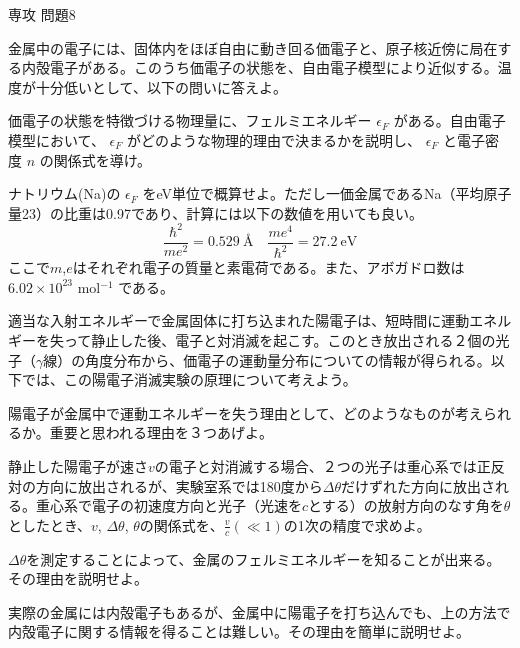 \documentclass[fleqn]{jbook}
\begin{document}
\begin{question}{専攻 問題8}{}

金属中の電子には、固体内をほぼ自由に動き回る価電子と、原子核近傍に局在する内殻電子がある。このうち価電子の状態を、自由電子模型により近似する。温度が十分低いとして、以下の問いに答えよ。

\begin{subquestions}

\SubQuestion

価電子の状態を特徴づける物理量に、フェルミエネルギー $ \epsilon_{F} $ がある。自由電子模型において、 $ \epsilon_{F} $ がどのような物理的理由で決まるかを説明し、 $ \epsilon_{F} $ と電子密度 $ n $ の関係式を導け。

\SubQuestion

 ナトリウム(Na)の $ \epsilon_{F} $ をeV単位で概算せよ。ただし一価金属であるNa（平均原子量23）の比重は0.97であり、計算には以下の数値を用いても良い。
\[
\frac{\hbar^{2}}{m e^{2}} = 0.529\ \textrm{\AA}  \quad \frac{m e^{4}}{\hbar^{2}} = 27.2\ \mathrm{eV}
\]
ここで$m$,$e$はそれぞれ電子の質量と素電荷である。また、アボガドロ数は$ 6.02 \times 10^{23}$ mol$^{-1}$ である。

\end{subquestions}

適当な入射エネルギーで金属固体に打ち込まれた陽電子は、短時間に運動エネルギーを失って静止した後、電子と対消滅を起こす。このとき放出される２個の光子（$\gamma$線）の角度分布から、価電子の運動量分布についての情報が得られる。以下では、この陽電子消滅実験の原理について考えよう。

\begin{subquestions}[3]
\SubQuestion

陽電子が金属中で運動エネルギーを失う理由として、どのようなものが考えられるか。重要と思われる理由を３つあげよ。

\SubQuestion

静止した陽電子が速さ$v$の電子と対消滅する場合、２つの光子は重心系では正反対の方向に放出されるが、実験室系では180度から$\Delta \theta$だけずれた方向に放出される。重心系で電子の初速度方向と光子（光速を$c$とする）の放射方向のなす角を$\theta$としたとき、$v$, $\Delta \theta$, $\theta$の関係式を、$\frac{v}{c} (\ll 1)$の1次の精度で求めよ。

\SubQuestion

$\Delta \theta$を測定することによって、金属のフェルミエネルギーを知ることが出来る。その理由を説明せよ。

\SubQuestion

実際の金属には内殻電子もあるが、金属中に陽電子を打ち込んでも、上の方法で内殻電子に関する情報を得ることは難しい。その理由を簡単に説明せよ。


\end{subquestions}
\end{question}
\end{document}
